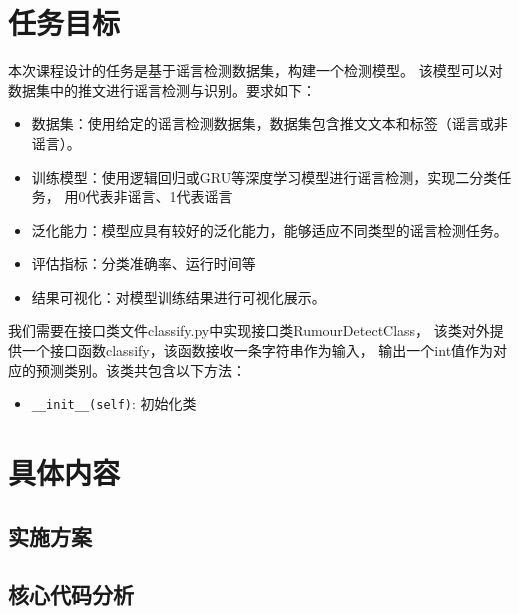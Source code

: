 \chapter{任务目标}

本次课程设计的任务是基于谣言检测数据集，构建一个检测模型。
该模型可以对数据集中的推文进行谣言检测与识别。要求如下：
\begin{itemize}
    \item 数据集：使用给定的谣言检测数据集，数据集包含推文文本和标签（谣言或非谣言）。
    \item 训练模型：使用逻辑回归或GRU等深度学习模型进行谣言检测，实现二分类任务，
    用0代表非谣言、1代表谣言
    \item 泛化能力：模型应具有较好的泛化能力，能够适应不同类型的谣言检测任务。
    \item 评估指标：分类准确率、运行时间等
    \item 结果可视化：对模型训练结果进行可视化展示。
\end{itemize}

\vspace{1em}

我们需要在接口类文件classify.py中实现接口类RumourDetectClass，
该类对外提供一个接口函数classify，该函数接收一条字符串作为输入，
输出一个int值作为对应的预测类别。该类共包含以下方法：
\begin{itemize}
    \item \texttt{\_\_init\_\_(self)}: 初始化类
\end{itemize}

\chapter{具体内容}

\section{实施方案}


\section{核心代码分析}

